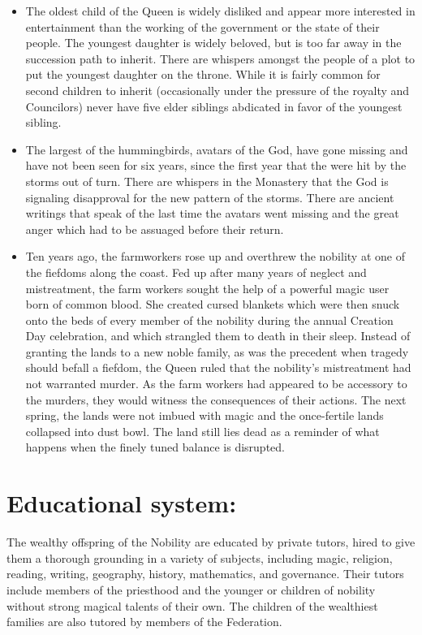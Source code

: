 \documentclass[blue]{GL2020}
\begin{document}
\begin{itemize}
	\item The oldest child of the Queen is widely disliked and appear more interested in entertainment than the working of the government or the state of their people.  The youngest daughter is widely beloved, but is too far away in the succession path to inherit.  There are whispers amongst the people of a plot to put the youngest daughter on the throne.  While it is fairly common for second children to inherit (occasionally under the pressure of the royalty and Councilors) never have five elder siblings abdicated in favor of the youngest sibling.
	\item The largest of the hummingbirds, avatars of the God, have gone missing and have not been seen for six years, since the first year that the \pShip{} were hit by the storms out of turn.  There are whispers in the Monastery that the God is signaling disapproval for the new pattern of the storms.  There are ancient writings that speak of the last time the avatars went missing and the great anger which had to be assuaged before their return. %
	\item Ten years ago, the farmworkers rose up and overthrew the nobility at one of the fiefdoms along the coast.  Fed up after many years of neglect and mistreatment, the farm workers sought the help of a powerful magic user born of common blood.  She created cursed blankets which were then snuck onto the beds of every member of the nobility during the annual Creation Day celebration, and which strangled them to death in their sleep.  Instead of granting the lands to a new noble family, as was the precedent when tragedy should befall a fiefdom, the Queen ruled that the nobility's mistreatment had not warranted murder.  As the farm workers had appeared to be accessory to the murders, they would witness the consequences of their actions.  The next spring, the lands were not imbued with magic and the once-fertile lands collapsed into dust bowl.  The land still lies dead as a reminder of what happens when the finely tuned balance is disrupted.
\end{itemize}

\section*{Educational system:}

The wealthy offspring of the Nobility are educated by private tutors, hired to give them a thorough grounding in a variety of subjects, including magic, religion, reading, writing, geography, history, mathematics, and governance.  Their tutors include members of the priesthood and the younger or children of nobility without strong magical talents of their own.  The children of the wealthiest families are also tutored by members of the Federation.
\end{document}
